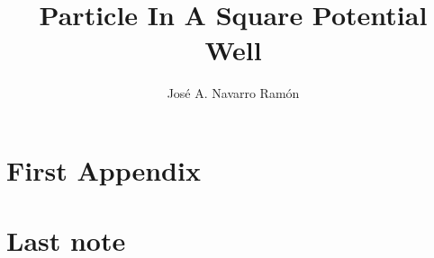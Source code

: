 \documentclass[svgnames,a4paper,twoside]{book}
\title{Particle In A Square Potential Well}
\author{José A. Navarro Ramón}
\begin{document}
\frontmatter

\maketitle
\tableofcontents

\mainmatter


\appendix
\chapter{First Appendix}

\backmatter
\chapter{Last note}
\end{document}
